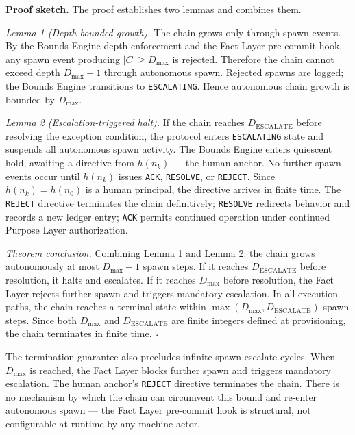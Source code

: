 \medskip
\noindent\textbf{Proof sketch.}
The proof establishes two lemmas and combines them.

\medskip
\textit{Lemma 1 (Depth-bounded growth).}
The chain grows only through spawn events. By the Bounds Engine depth enforcement and the Fact Layer pre-commit hook, any spawn event producing $|C| \geq D_{\mathrm{max}}$ is rejected. Therefore the chain cannot exceed depth $D_{\mathrm{max}} - 1$ through autonomous spawn. Rejected spawns are logged; the Bounds Engine transitions to \texttt{ESCALATING}. Hence autonomous chain growth is bounded by $D_{\mathrm{max}}$.

\medskip
\textit{Lemma 2 (Escalation-triggered halt).}
If the chain reaches $D_{\mathrm{ESCALATE}}$ before resolving the exception condition, the protocol enters \texttt{ESCALATING} state and suspends all autonomous spawn activity. The Bounds Engine enters quiescent hold, awaiting a directive from $h(n_k)$ — the human anchor. No further spawn events occur until $h(n_k)$ issues \texttt{ACK}, \texttt{RESOLVE}, or \texttt{REJECT}. Since $h(n_k) = h(n_0)$ is a human principal, the directive arrives in finite time. The \texttt{REJECT} directive terminates the chain definitively; \texttt{RESOLVE} redirects behavior and records a new ledger entry; \texttt{ACK} permits continued operation under continued Purpose Layer authorization.

\medskip
\textit{Theorem conclusion.}
Combining Lemma 1 and Lemma 2: the chain grows autonomously at most $D_{\mathrm{max}} - 1$ spawn steps. If it reaches $D_{\mathrm{ESCALATE}}$ before resolution, it halts and escalates. If it reaches $D_{\mathrm{max}}$ before resolution, the Fact Layer rejects further spawn and triggers mandatory escalation. In all execution paths, the chain reaches a terminal state within $\max(D_{\mathrm{max}}, D_{\mathrm{ESCALATE}})$ spawn steps. Since both $D_{\mathrm{max}}$ and $D_{\mathrm{ESCALATE}}$ are finite integers defined at provisioning, the chain terminates in finite time. $\square$

The termination guarantee also precludes infinite spawn-escalate cycles. When $D_{\mathrm{max}}$ is reached, the Fact Layer blocks further spawn and triggers mandatory escalation. The human anchor's \texttt{REJECT} directive terminates the chain. There is no mechanism by which the chain can circumvent this bound and re-enter autonomous spawn — the Fact Layer pre-commit hook is structural, not configurable at runtime by any machine actor.

